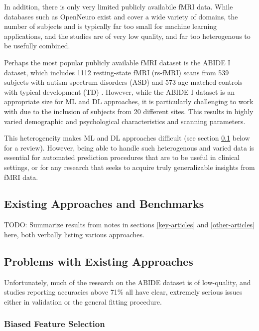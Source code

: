 \documentclass[10pt]{article}
\begin{document}
In addition, there is only very limited publicly availabile fMRI data. While databases such as
OpenNeuro \citep{markiewiczOpenNeuroOpenResource2021} exist and cover a wide variety of domains, the
number of subjects and is typically far too small for machine learning applications, and the studies
are of very  low quality, and far too heterogenous to be usefully combined.

Perhaps the most popular publicly available fMRI dataset is the ABIDE I dataset, which includes 1112
resting-state fMRI (rs-fMRI) scans from 539 subjects with autism spectrum disorders (ASD) and 573
age-matched controls with typical development (TD) \citep{dimartinoAutismBrainImaging2014}. However,
while the ABIDE I dataset is an appropriate size for ML and DL approaches, it is particularly
challenging to work with due to the inclusion of subjects from 20 different sites. This results in
highly varied demographic and psychological characteristics and scanning parameters.

This heterogeneity makes ML and DL approaches difficult (see section \ref{existing-attempts} below
for a review). However, being able to handle such heterogenous and varied data is essential for
automated prediction procedures that are to be useful in clinical settings, or for any research that
seeks to acquire truly generalizable insights from fMRI data.

\subsection{Existing Approaches and Benchmarks} \label{existing-attempts}

TODO: Summarize results from notes in sections \ref{key-articles} and \ref{other-articles} here,
both verbally listing various approaches.

\subsection{Problems with Existing Approaches}

Unfortunately, much of the research on the ABIDE dataset is of low-quality, and studies reporting
accuracies above 71\% all have clear, extremely serious issues either in validation or the general
fitting procedure.

\subsubsection{Biased Feature Selection}
\end{document}
